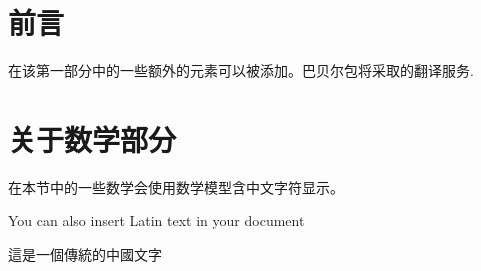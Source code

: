 \documentclass{article}
\begin{document}
    
\begin{CJK*}{UTF8}{gbsn}
    
\section{前言}
在该第一部分中的一些额外的元素可以被添加。巴贝尔包将采取的翻译服务.
    
\section{关于数学部分}
在本节中的一些数学会使用数学模型含中文字符显示。
    
\end{CJK*}
    
\vspace{0.5cm} %
    
\noindent
You can also insert Latin text in your document
    
\vspace{0.5cm}
    
\noindent
\begin{CJK*}{UTF8}{bsmi}
這是一個傳統的中國文字
\end{CJK*}
    
\end{document}
